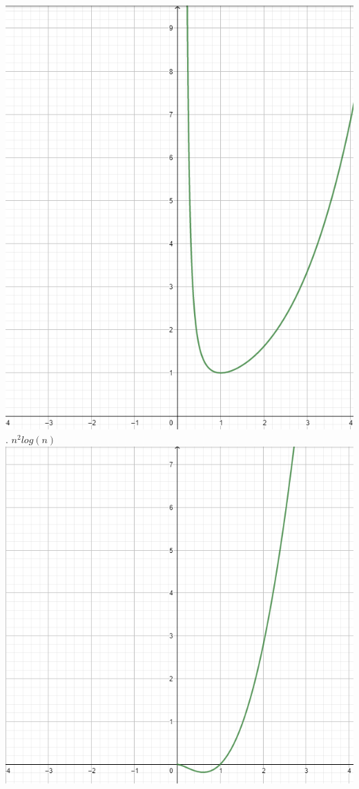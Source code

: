 \documentclass{article}
\begin{document}
\newline
\includegraphics[scale = 0.5]{ntothelog}
\newline
\newline
{}. $n^{2}log(n)$
\newline
\newline
\includegraphics[scale = 0.41]{cuadraticlog}
\end{document}
